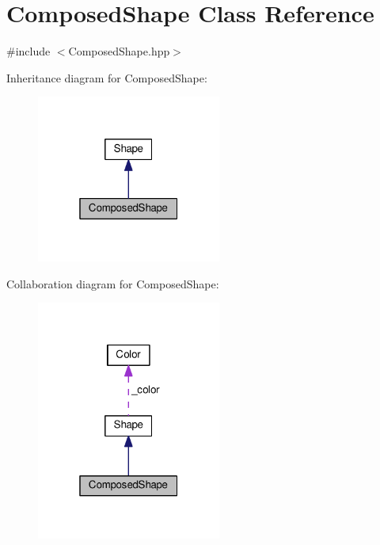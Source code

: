 \hypertarget{class_composed_shape}{}\section{Composed\+Shape Class Reference}
\label{class_composed_shape}


{\ttfamily \#include $<$Composed\+Shape.\+hpp$>$}



Inheritance diagram for Composed\+Shape\+:\nopagebreak
\begin{figure}[H]
\begin{center}
\leavevmode
\includegraphics[width=172pt]{class_composed_shape__inherit__graph}
\end{center}
\end{figure}


Collaboration diagram for Composed\+Shape\+:\nopagebreak
\begin{figure}[H]
\begin{center}
\leavevmode
\includegraphics[width=172pt]{class_composed_shape__coll__graph}
\end{center}
\end{figure}
